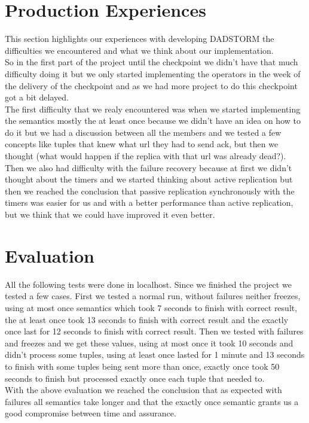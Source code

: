 \documentclass[times, 10pt, twocolumn]{article}
\begin{document}
\section{Production Experiences}
This section highlights our experiences with developing DADSTORM the difficulties we encountered and what we think about our implementation.
\\So in the first part of the project until the checkpoint we didn't have that much difficulty doing it but we only started implementing the operators in the week of the delivery of the checkpoint and as we had more project to do this checkpoint got a bit delayed.
\\The first difficulty that we realy encountered was when we started implementing the semantics mostly the at least once because we didn't have an idea on how to do it but we had a discussion between all the members and we tested a few concepts like tuples that knew what url they had to send ack, but then we thought (what would happen if the replica with that url was already dead?).
\\Then we also had difficulty with the failure recovery because at first we didn't thought about the timers and we started thinking about active replication but then we reached the conclusion that passive replication synchronously with the timers was easier for us and with a better performance than active replication, but we think that we could have improved it even better. 




\section{Evaluation}
All the following tests were done in localhost.
Since we finished the project we tested a few cases. First we tested a normal run, without failures neither freezes, using at most once semantics which took 7 seconds to finish with correct result, the at least once took 13 seconds to finish with correct result and the exactly once last for 12 seconds to finish with correct result. Then we tested with failures and freezes and we get these values, using at most once it took 10 seconds and didn't process some tuples, using at least once lasted for 1 minute and 13 seconds to finish with some tuples being sent more than once, exactly once took 50 seconds to finish but processed exactly once each tuple that needed to.
\\With the above evaluation we reached the conclusion that as expected with failures all semantics take longer and that the exactly once semantic grants us a good compromise between time and assurance.
\end{document}
